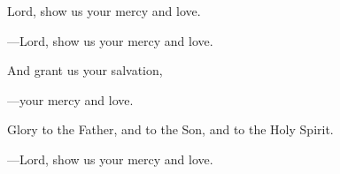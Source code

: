 \responsory

\begin{hangpar}
Lord, show us your mercy and love.

{\color{red}---\thinspace}Lord, show us your mercy and love.

\medskip And grant us your salvation,

{\color{red}---\thinspace}your mercy and love.

\medskip Glory to the Father, and to the Son, and to the Holy Spirit.

{\color{red}---\thinspace}Lord, show us your mercy and love.
\end{hangpar}